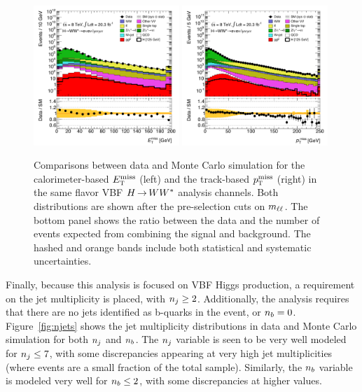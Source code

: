 \begin{figure}[h!]
  \centering
  \captionsetup{justification=centering}
  \includegraphics[width=0.49\textwidth]{figures/VBF_cb_met}
  \includegraphics[width=0.49\textwidth]{figures/VBF_cb_trackmet}

  \caption{Comparisons between data and Monte Carlo simulation for the calorimeter-based $E_{\textrm{\footnotesize\sc t}}^{\rm miss}$ (left) and the track-based $p_{\textrm{\footnotesize\sc t}}^{\rm miss}$ (right) in the same flavor VBF $H{\,{\rightarrow}\,}WW^\ast$ analysis channels. Both distributions are shown after the pre-selection cuts on $m_{\ell\ell}$. The bottom panel shows the ratio between the data and the number of events expected from combining the signal and background. The hashed and orange bands include both statistical and systematic uncertainties.}
  \label{fig:VBF_cb_met}
\end{figure}

Finally, because this analysis is focused on VBF Higgs production, a requirement on the jet multiplicity is placed, with $n_j \geq 2$. Additionally, the analysis requires that there are no jets identified as b-quarks in the event, or $n_b = 0$. Figure~\ref{fig:njets} shows the jet multiplicity distributions in data and Monte Carlo simulation for both $n_j$ and $n_b$. The $n_j$ variable is seen to be very well modeled for $n_j \leq 7$, with some discrepancies appearing at very high jet multiplicities (where events are a small fraction of the total sample). Similarly, the $n_b$ variable is modeled very well for $n_b \leq 2$, with some discrepancies at higher values. 

